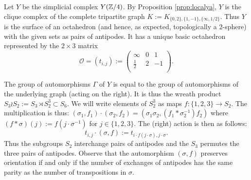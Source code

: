 \documentclass[12pt]{amsart}
\theoremstyle{definition}
\newcommand{\F}[1]{\Bbb{F}_{#1}}
\newcommand{\Z}{\Bbb{Z}}
\newcommand{\oct}{\mathcal{O}}%
\newcommand{\pgl}[2]{\mathrm{PGL}_{#1}(#2)}
\newcommand{\pn}[2]{\mathbb{P}^{#1}(#2)}
\newcommand{\projl}[1]{\pn{1}{#1}}
\newcommand{\<}{\langle}
\renewcommand{\>}{\rangle}
\begin{document}




Let $Y$ be the simplicial complex $Y(\Z/4)$. By Proposition \ref{prop:localya}, $Y$ is the clique complex of the complete tripartite graph $K:=K_{\{ 0,2\}, \{ 1,-1\}, \{ \infty,1/2\}}$. 
Thus $Y$ is the surface of an octahedron (and hence, as expected, topologically a $2$-sphere) with the given sets as pairs of antipodes. It has a unique basic octahedron represented by the $2\times 3$ matrix
\[
\oct=(t_{i,j}):=
\left(
\begin{array}{lll}
\infty&0&1\\
\frac{1}{2}&2&-1\\
\end{array}
\right).
\]

The group of automorphisms $\Gamma$ of $Y$ is equal to the group of automorphisms of the underlying graph  (acting on the right). It is thus the wreath product $S_3\wr S_2:=
S_3\rtimes S_2^3\subset S_6$. We will write elements of $S_2^3$ as maps $f:\{ 1,2,3\}\to S_2$. The multiplication is thus: $(\sigma_1,f_1)\cdot (\sigma_2,f_2)=(\sigma_1\sigma_2, (f_1\ast \sigma_2^{-1})f_2)$ where $(f\ast\sigma)(j):=f(j\cdot\sigma^{-1})$ for $j\in \{ 1,2,3\}$. The (right)  action is then as follows:
\[
t_{i,j}\cdot (\sigma,f):=t_{i\cdot f(j\cdot\sigma),j\cdot\sigma}.
\]
Thus the subgroups $S_2$ interchange pairs of antipodes and the $S_3$ permutes the three pairs of antipodes. Observe that the automorphism $(\sigma,f)$ preserves orientation if and only if the number of exchanges of antipodes has the same parity as the number of transpositions in $\sigma$.
\end{document}
